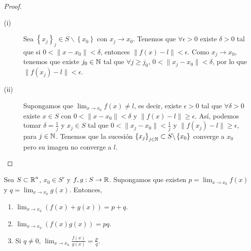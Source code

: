 \begin{proof}
\begin{description}
	\item[(i)] Sea $\displaystyle \left\{ x_{j}\right\} _{j} \in S \backslash \left\{ x_{0}\right\}  $ con $\displaystyle x_{j} \to x_{0} $. Tenemos que $\displaystyle \forall \epsilon > 0 $ existe $\displaystyle \delta > 0 $ tal que si $\displaystyle  0 < \| x - x_{0}\| < \delta  $, entonces $\displaystyle \|f\left(x\right)-l\| < \epsilon  $. Como $\displaystyle x_{j} \to x_{0} $, tenemos que existe $\displaystyle j _{0} \in \mathbb{N} $ tal que $\displaystyle \forall j \geq j_{0} $, $\displaystyle 0 < \|x_{j}-x_{0}\| < \delta  $, por lo que $\displaystyle \| f\left(x_{j}\right)-l \| < \epsilon  $. 
	\item[(ii)] Supongamos que $\displaystyle \lim_{x \to x_{0}}f\left(x\right) \neq l $, es decir, existe $\displaystyle \epsilon > 0 $ tal que $\displaystyle \forall \delta > 0 $ existe $\displaystyle x \in S $ con $\displaystyle 0 < \|x - x_{0}\|< \delta  $ y $\displaystyle \|f\left(x\right)-l\| \geq \epsilon  $. 
		Así, podemos tomar $\displaystyle \delta = \frac{1}{j} $ y $\displaystyle x_{j} \in S $ tal que $\displaystyle 0< \|x_{j}-x_{0}\| < \frac{1}{j} $ y $\displaystyle \|f\left(x_{j}\right)-l\| \geq \epsilon  $, para $\displaystyle j \in \mathbb{N} $. Tenemos que la sucesión $\displaystyle \left\{ x_{j}\right\} _{j\in \mathbb{N}} \subset S\backslash \left\{ x_{0}\right\}  $ converge a $\displaystyle x_{0} $ pero su imagen no converge a $\displaystyle l $.
\end{description}
\end{proof}
\begin{prop}
Sea $\displaystyle S \subset \mathbb{R}^{n} $, $\displaystyle x_{0} \in S' $ y $\displaystyle f, g : S \to \mathbb{R} $. Supongamos que existen $\displaystyle p = \lim_{x \to x_{0}}f\left(x\right) $ y $\displaystyle q =\lim_{x \to x_{0}}g\left(x\right) $. 
Entonces, 
\begin{enumerate}
\item $\displaystyle \lim_{x \to x_{0}}\left(f\left(x\right) + g\left(x\right)\right) = p + q $.
\item $\displaystyle \lim_{x \to x_{0}}\left(f\left(x\right)g\left(x\right)\right) = pq $.
\item Si $\displaystyle q \neq 0 $, $\displaystyle \lim_{x \to x_{0}}\frac{f\left(x\right)}{g\left(x\right)} = \frac{p}{q} $.
\end{enumerate}
\end{prop}
